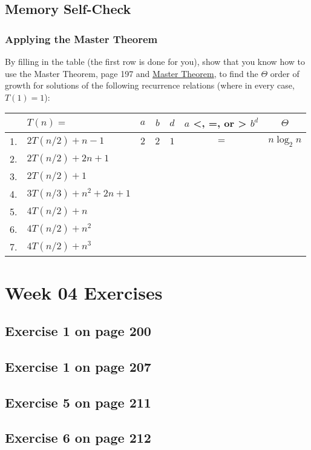 \documentclass[12pt]{amsart}
\begin{document}
\subsection{Memory Self-Check}

\subsubsection{Applying the Master Theorem}


By filling in the table (the first row is done for you), show that you know
  how to use the Master Theorem, page 197 and \href{run:../support_files/master_theorem.pdf}{Master Theorem}, to find the $\Theta$ order of growth for solutions of the following recurrence relations (where in every case, $T(1) = 1$):
  \\
\begin{tabular}{|c|l|c|c|c|c|c|}
\hline
    &$T(n) =$           & $a$ & $b$ & $d$ & $a$ <, =, or > $b^d$ & $\Theta$ \\
\hline
1. & $2T(n/2)+n-1$ & $2$ & $2$ & $1$ & $=$ & $n\log_2 n$ \\
\hline
2. & $2T(n/2)+2n+1$ &  &  & & &  \\
\hline
3. & $2T(n/2)+1$ &  &  & & &  \\
\hline
4. & $3T(n/3)+n^2+2n+1$ &  &  & & &  \\
\hline
5. & $4T(n/2)+n$ &  &  & & &  \\
\hline
6. & $4T(n/2)+n^2$ &  &  & & &  \\
\hline
7. & $4T(n/2)+n^3$ &  &  & & &  \\
\hline
\end{tabular}
 \section{Week 04 Exercises}
\subsection{ Exercise 1 on page 200} 
\subsection{Exercise 1 on page 207} 
\subsection{Exercise 5 on page 211} 
\subsection{Exercise 6 on page 212} 
\end{document}
